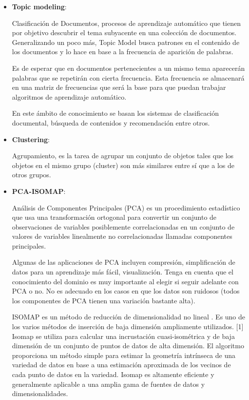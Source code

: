 \documentclass[12pt, runningheads,a4]{book}
\begin{document}
	\begin{itemize}
	\item \textbf{Topic modeling}: 
	
	Clasificación de Documentos, procesos de aprendizaje automático que tienen por objetivo descubrir el tema subyacente en una colección de documentos. Generalizando un poco más, Topic Model busca patrones en el contenido de los documentos y lo hace en base a la frecuencia de aparición de palabras.
	
	Es de esperar que en documentos pertenecientes a un mismo tema aparecerán palabras que se repetirán con cierta frecuencia. Esta frecuencia se almacenará en una matriz de frecuencias que será la base para que puedan trabajar algoritmos de aprendizaje automático.
	
	En este ámbito de conocimiento se basan los sistemas de clasificación documental, búsqueda de contenidos y recomendación entre otros.
	
	\item \textbf{Clustering}: 
	
	Agrupamiento, es la tarea de agrupar un conjunto de objetos tales que los objetos en el mismo grupo (cluster) son más similares entre sí que a los de otros grupos.
	
	\item \textbf{PCA-ISOMAP}:
	
	Análisis de Componentes Principales (PCA) es un procedimiento estadístico que usa una transformación ortogonal para convertir un conjunto de observaciones de variables posiblemente correlacionadas en un conjunto de valores de variables linealmente no correlacionadas llamadas componentes principales.
	
	Algunas de las aplicaciones de PCA incluyen compresión, simplificación de datos para un aprendizaje más fácil, visualización. Tenga en cuenta que el conocimiento del dominio es muy importante al elegir si seguir adelante con PCA o no. No es adecuado en los casos en que los datos son ruidosos (todos los componentes de PCA tienen una variación bastante alta). 
	
	ISOMAP es un método de reducción de dimensionalidad no lineal . Es uno de los varios métodos de inserción de baja dimensión ampliamente utilizados. [1] Isomap se utiliza para calcular una incrustación cuasi-isométrica y de baja dimensión de un conjunto de puntos de datos de alta dimensión. El algoritmo proporciona un método simple para estimar la geometría intrínseca de una variedad de datos en base a una estimación aproximada de los vecinos de cada punto de datos en la variedad. Isomap es altamente eficiente y generalmente aplicable a una amplia gama de fuentes de datos y dimensionalidades.

	
	\end{itemize}
\end{document}
